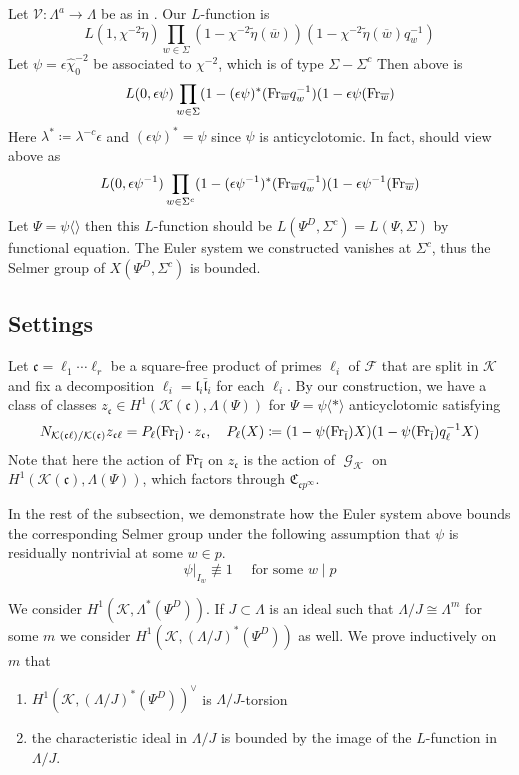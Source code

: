 \documentclass[leqno]{amsart}
\theoremstyle{definition}
\theoremstyle{remark}
\DeclareMathOperator{\Gal}{\mathcal{G}}
\newcommand{\Fr}{\textnormal{Fr}} %
\newcommand{\fc}{\mathfrak{c}}
\newcommand{\fl}{\mathfrak{l}}
\newcommand{\F}{{\mathcal{F}}} %
\newcommand{\K}{{\mathcal{K}}} %
\newcommand{\bw}{\overline{w}}
\newcommand{\flw}{\bar{\fl}}
\newcommand{\rp}[1]{\mathfrak{C}_{#1}} %
\newcommand{\rk}[1]{\K({#1})} %
\begin{document}
Let $\mathscr{V}\colon \Lambda^a\to \Lambda$
be as in \cite{HT94}.
Our $L$-function is
\[
L(1,\chi^{-2}\tilde{\eta})\prod_{w\in\Sigma}
(1-\chi^{-2}\tilde{\eta}(\bw))
(1-\chi^{-2}\tilde{\eta}(\bw)q_w^{-1})
\]
Let $\psi=\epsilon\hat{\chi}_0^{-2}$ be associated to 
$\chi^{-2}$, which is of type $\Sigma-\Sigma^c$
Then above is 
\[
	L(0,\epsilon\psi)\prod_{w\in \Sigma}
	(1-(\epsilon\psi)^*(\Fr_{\bw}q_w^{-1})
	(1-\epsilon\psi(\Fr_{\bw})
\]
Here  $\lambda^*\coloneqq \lambda^{-c}\epsilon$ 
and $(\epsilon\psi)^*=\psi$ since  $\psi$
is anticyclotomic.
In fact, should view above as
\[
	L(0,\epsilon\psi^{-1})\prod_{w\in\Sigma^c}
	(1-(\epsilon\psi^{-1})^*(\Fr_{\bw}q_w^{-1})
	(1-\epsilon\psi^{-1}(\Fr_{\bw})
\]
Let $\Psi=\psi\langle\rangle$
then this  $L$-function
should be $L(\Psi^D,\Sigma^c)=L(\Psi,\Sigma)$
by functional equation.
The Euler system we constructed vanishes at  $\Sigma^c$,
thus the Selmer group of  $X(\Psi^D,\Sigma^c)$
is bounded. 


\cite{Och05}
\cite{Och08}
\cite{Hsieh2010}
\cite{HT93}
\cite{Hida06}
\cite{Hida06b}
\cite{Rubin}

\subsection{Settings}

Let $\fc=\ell_1\cdots\ell_r$
be a square-free product
of primes $\ell_i$ of  $\F$
that are split in  $\K$
and fix a decomposition
$\ell_i=\fl_i\flw_i$
for each  $\ell_i$.
By our construction, we have 
a class of classes
$z_\fc\in H^1(\rk{\fc},\Lambda(\Psi))$
for  $\Psi=\psi\langle*\rangle$ anticyclotomic 
satisfying 
\[
	N_{\rk{\fc\ell}/\rk{\fc}}z_{\fc\ell}=
	P_\ell(\Fr_{\bar{\fl}})\cdot z_\fc,\quad
	P_\ell(X)\coloneqq(1-\psi(\Fr_{\flw})X)
	(1-\psi(\Fr_{\flw})q_\ell^{-1}X)
\]
Note that here the action of $\Fr_{\flw}$
on $z_{\fc}$ is the action of $\Gal_\K$
on  $H^1(\rk{\fc},\Lambda(\Psi))$,
which factors through  $\rp{\fc p^\infty}$.

In the rest of the subsection,
we demonstrate how the Euler system above
bounds the corresponding Selmer group 
under the following assumption
that $\psi$ is residually nontrivial
at some $w\in p$.
\begin{equation}\label{cond:distinct}\tag{dist}
	\psi\vert_{I_w}\not\equiv1\quad
	\text{ for some } w\mid p
\end{equation}

We consider $H^1(\K, \Lambda^*(\Psi^D))$. 
If  $J\subset \Lambda$ is an ideal 
such that  $\Lambda/J\cong \Lambda^{m}$ for some $m$
we consider  $H^1(\K,(\Lambda/J)^*(\Psi^D))$ as well.
We prove inductively on  $m$ that 
\begin{enumerate}[label=(\alph*)]
	\item $H^1(\K,(\Lambda/J)^*(\Psi^D))^\vee$ is $\Lambda/J$-torsion
	\item the characteristic ideal in $\Lambda/J$
		is bounded by the image of the $L$-function in $\Lambda/J$.
\end{enumerate}
\end{document}
